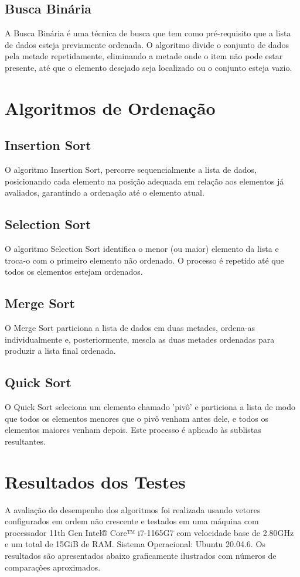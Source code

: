 \documentclass[conference]{IEEEtran}
\begin{document}
{\subsection{Busca Binária}
A Busca Binária é uma técnica de busca que tem como pré-requisito que a lista de dados esteja previamente ordenada. O algoritmo divide o conjunto de dados pela metade repetidamente, eliminando a metade onde o item não pode estar presente, até que o elemento desejado seja localizado ou o conjunto esteja vazio.

\section{Algoritmos de Ordenação}
\subsection{Insertion Sort}
O algoritmo Insertion Sort, percorre sequencialmente a lista de dados, posicionando cada elemento na posição adequada em relação aos elementos já avaliados, garantindo a ordenação até o elemento atual.

\subsection{Selection Sort}
O algoritmo Selection Sort identifica o menor (ou maior) elemento da lista e troca-o com o primeiro elemento não ordenado. O processo é repetido até que todos os elementos estejam ordenados.

\subsection{Merge Sort}
O Merge Sort particiona a lista de dados em duas metades, ordena-as individualmente e, posteriormente, mescla as duas metades ordenadas para produzir a lista final ordenada.

\subsection{Quick Sort}
O Quick Sort seleciona um elemento chamado 'pivô' e particiona a lista de modo que todos os elementos menores que o pivô venham antes dele, e todos os elementos maiores venham depois. Este processo é aplicado às sublistas resultantes.

\section{Resultados dos Testes}
A avaliação do desempenho dos algoritmos foi realizada usando vetores configurados em ordem não crescente e testados em uma máquina com processador 11th Gen Intel® Core™ i7-1165G7 com velocidade base de 2.80GHz e um total de 15GiB de RAM. Sistema Operacional: Ubuntu 20.04.6. Os resultados são apresentados abaixo graficamente ilustrados com números de comparações aproximados.


}
\end{document}
